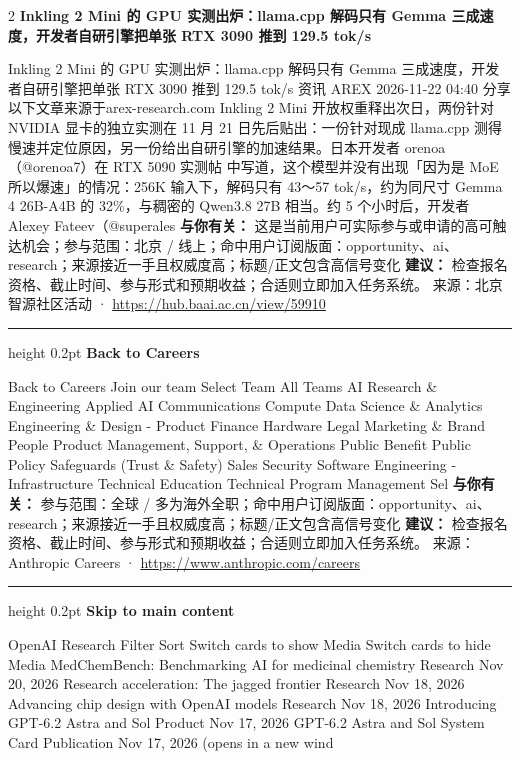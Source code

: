 \documentclass[10.5pt]{ctexart}
\begin{document}
\begin{multicols}{2}
{\large\bfseries Inkling 2 Mini 的 GPU 实测出炉：llama.cpp 解码只有 Gemma 三成速度，开发者自研引擎把单张 RTX 3090 推到 129.5 tok/s}\par
Inkling 2 Mini 的 GPU 实测出炉：llama.cpp 解码只有 Gemma 三成速度，开发者自研引擎把单张 RTX 3090 推到 129.5 tok/s 资讯 AREX 2026-11-22 04:40 分享 以下文章来源于arex-research.com Inkling 2 Mini 开放权重释出次日，两份针对 NVIDIA 显卡的独立实测在 11 月 21 日先后贴出：一份针对现成 llama.cpp 测得慢速并定位原因，另一份给出自研引擎的加速结果。日本开发者 orenoa（@orenoa7）在 RTX 5090 实测帖 中写道，这个模型并没有出现「因为是 MoE 所以爆速」的情况：256K 输入下，解码只有 43～57 tok/s，约为同尺寸 Gemma 4 26B-A4B 的 32\%，与稠密的 Qwen3.8 27B 相当。约 5 个小时后，开发者 Alexey Fateev（@superales
\textbf{与你有关：} 这是当前用户可实际参与或申请的高可触达机会；参与范围：北京 / 线上；命中用户订阅版面：opportunity、ai、research；来源接近一手且权威度高；标题/正文包含高信号变化
\textbf{建议：} 检查报名资格、截止时间、参与形式和预期收益；合适则立即加入任务系统。
{\footnotesize\color{ormuted} 来源：北京智源社区活动 · \url{https://hub.baai.ac.cn/view/59910}}
\vspace{2mm}
\hrule height 0.2pt
\vspace{2mm}
{\large\bfseries Back to Careers}\par
Back to Careers Join our team Select Team All Teams AI Research \& Engineering Applied AI Communications Compute Data Science \& Analytics Engineering \& Design - Product Finance Hardware Legal Marketing \& Brand People Product Management, Support, \& Operations Public Benefit Public Policy Safeguards (Trust \& Safety) Sales Security Software Engineering - Infrastructure Technical Education Technical Program Management Sel
\textbf{与你有关：} 参与范围：全球 / 多为海外全职；命中用户订阅版面：opportunity、ai、research；来源接近一手且权威度高；标题/正文包含高信号变化
\textbf{建议：} 检查报名资格、截止时间、参与形式和预期收益；合适则立即加入任务系统。
{\footnotesize\color{ormuted} 来源：Anthropic Careers · \url{https://www.anthropic.com/careers}}
\vspace{2mm}
\hrule height 0.2pt
\vspace{2mm}
{\large\bfseries Skip to main content}\par
OpenAI Research Filter Sort Switch cards to show Media Switch cards to hide Media MedChemBench: Benchmarking AI for medicinal chemistry Research Nov 20, 2026 Research acceleration: The jagged frontier Research Nov 18, 2026 Advancing chip design with OpenAI models Research Nov 18, 2026 Introducing GPT-6.2 Astra and Sol Product Nov 17, 2026 GPT‑6.2 Astra and Sol System Card Publication Nov 17, 2026 (opens in a new wind

\end{multicols}
\end{document}
